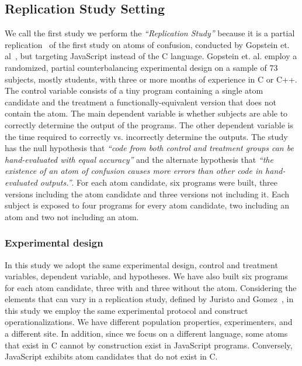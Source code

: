 \subsection{Replication Study Setting}\label{sec:meth:replication}

We call the first study we perform the \textit{``Replication Study''} because it is a partial replication~\cite{Juristo2012} of the first study on atoms of confusion, conducted by Gopstein et. al~\cite{DBLP:conf/sigsoft/GopsteinIYDZYC17}, but targeting JavaScript instead of the C language. Gopstein et. al. employ a randomized, partial counterbalancing experimental design on a sample of 73 subjects, mostly students, with three or more months of experience in C or C++. The control variable consists of a tiny program containing a single atom candidate and the treatment a functionally-equivalent version that does not contain the atom. The main dependent variable is whether subjects are able to correctly determine the output of the programs. The other dependent variable is the time required to correctly vs. incorrectly determine the outputs. The study has the null hypothesis that \textit{``code from both control and treatment groups can be hand-evaluated with equal accuracy''} and the alternate hypothesis that \textit{``the existence of an atom of confusion causes more errors than other code in hand-evaluated outputs.''}. For each atom candidate, six programs were built, three versions including the atom candidate and three versions not including it. Each subject is exposed to four programs for every atom candidate, two including an atom and two not including an atom.  

\subsubsection*{Experimental design} 

In this study we adopt the same experimental design, control and treatment variables, dependent variable, and hypotheses. We have also built six programs for each atom candidate, three with and three without the atom. Considering the elements that can vary in a replication study, defined by Juristo and Gomez~\cite{Juristo2012}, in this study we employ the same experimental protocol and construct operationalizations. We have different population properties, experimenters, and a different site. In addition, since we focus on a different language, some atoms that exist in C cannot by construction exist in JavaScript programs. Conversely, JavaScript exhibits atom candidates that do not exist in C. 

